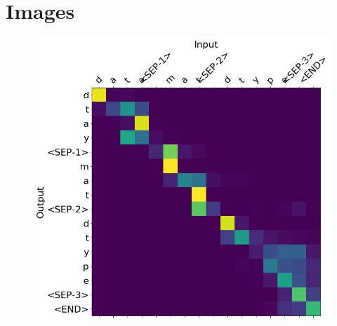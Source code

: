 \chapter{Images}
\label{images}

\begin{figure}
    \includegraphics[width=0.8\linewidth]{images/typical_attention.png}
\end{figure}

